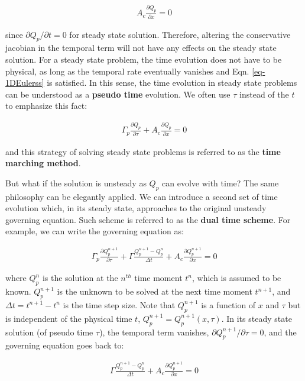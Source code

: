 \documentclass[12pt, letterpaper]{report}
\begin{document}
\begin{align}\label{eq-1DEulerss}
   A_c \frac{\partial Q_p}{\partial x} = 0
\end{align}

since $\partial Q_p / \partial t = 0$ for steady state solution. Therefore, altering the
conservative jacobian in the temporal term will not have any effects on the steady state solution.
For a steady state problem, the time evolution does not have to be physical, as long as the temporal
rate eventually vanishes and Eqn. \ref{eq-1DEulerss} is satisfied. In this sense, the time evolution
in steady state problems can be understood as a {\bf pseudo time} evolution. We often use $\tau$
instead of the $t$ to emphasize this fact:

\begin{align*}
   \Gamma_p \frac{\partial Q_p}{\partial \tau} + A_c \frac{\partial Q_p}{\partial x} = 0
\end{align*}

and this strategy of solving steady state problems is referred to as the {\bf time marching
method}.\paraspace

But what if the solution is unsteady as $Q_p$ can evolve with time? The same philosophy can be
elegantly applied. We can introduce a second set of time evolution which, in its steady state,
approaches to the original unsteady governing equation. Such scheme is referred to as the {\bf dual
time scheme}. For example, we can write the governing equation as:

\begin{align*}
   \Gamma_p \frac{\partial Q_p^{n+1}}{\partial \tau} + \Gamma \frac{Q_p^{n+1} - Q_p^n}{\Delta t} + A_c
   \frac{\partial Q_p^{n+1}}{\partial x} = 0
\end{align*}

where $Q_p^n$ is the solution at the $n^{th}$ time moment $t^n$, which is assumed to be known.
$Q_p^{n+1}$ is the unknown to be solved at the next time moment $t^{n+1}$, and $\Delta t = t^{n+1} -
t^n$ is the time step size. Note that $Q_p^{n+1}$ is a function of $x$ and $\tau$ but is independent
of the physical time $t$, $Q_p^{n+1} = Q_p^{n+1} (x,\tau)$. In its steady state solution (of pseudo
time $\tau$), the temporal term vanishes, $\partial Q_p^{n+1} / \partial \tau = 0$, and the
governing equation goes back to:

\begin{align*}
   \Gamma \frac{Q_p^{n+1} - Q_p^n}{\Delta t} + A_c \frac{\partial Q_p^{n+1}}{\partial x} = 0
\end{align*}
\end{document}

